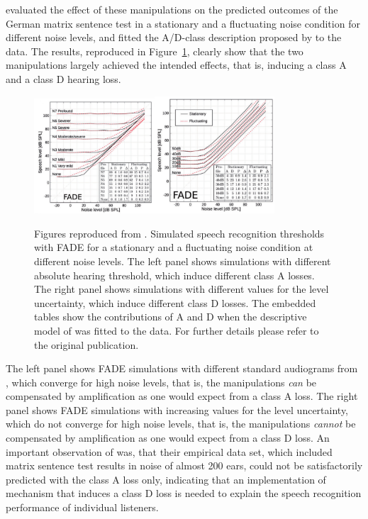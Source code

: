 \documentclass[10pt,a4paper,twocolumn]{article}
\begin{document}
\cite{kollmeier2016} evaluated the effect of these manipulations on the predicted outcomes of the German matrix sentence test in a stationary and a fluctuating noise condition for different noise levels, and fitted the A/D-class description proposed by \cite{plomp1978} to the data.
%
The results, reproduced in Figure~\ref{fig:2}, clearly show that the two manipulations largely achieved the intended effects, that is, inducing a class A and a class D hearing loss.
%
\begin{figure}[h]
	\centerline{\includegraphics[width=0.4\textwidth]{images/kollmeier-FADE-A}\includegraphics[width=0.4\textwidth]{images/kollmeier-FADE-D}} 
	\caption{Figures reproduced from \cite{kollmeier2015}.
		Simulated speech recognition thresholds with FADE for a stationary and a fluctuating noise condition at different noise levels.
		The left panel shows simulations with different absolute hearing threshold, which induce different class A losses.
		The right panel shows simulations with different values for the level uncertainty, which induce different class D losses.
		The embedded tables show the contributions of A and D when the descriptive model of \cite{plomp1978} was fitted to the data.
		For further details please refer to the original publication.}
	\label{fig:2}
\end{figure}
%
The left panel shows FADE simulations with different standard audiograms from \cite{bisgaard2010}, which converge for high noise levels, that is, the manipulations \emph{can} be compensated by amplification as one would expect from a class A loss.
%
The right panel shows FADE simulations with increasing values for the level uncertainty, which do not converge for high noise levels, that is, the manipulations \emph{cannot} be compensated by amplification as one would expect from a class D loss.
%
An important observation of \cite{kollmeier2015} was, that their empirical data set, which included matrix sentence test results in noise of almost 200 ears, could not be satisfactorily predicted with the class A loss only, indicating that an implementation of mechanism that induces a class D loss is needed to explain the speech recognition performance of individual listeners.
\end{document}
